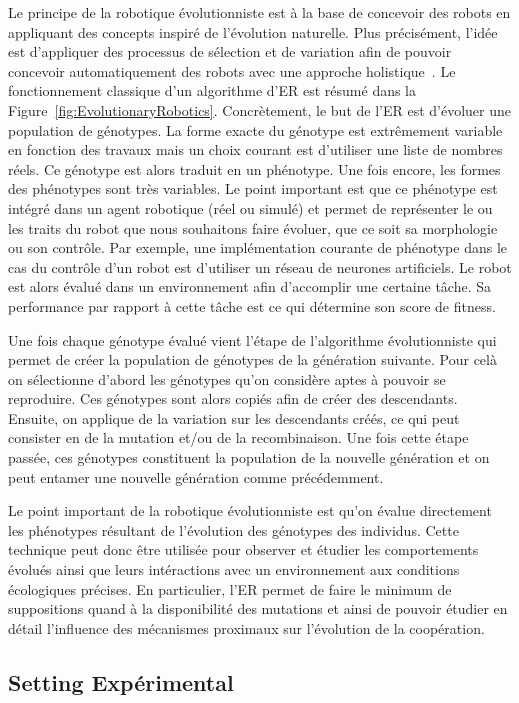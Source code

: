     Le principe de la robotique évolutionniste est à la base de concevoir des robots en appliquant des concepts inspiré de l'évolution naturelle. Plus précisément, l'idée est d'appliquer des processus de sélection et de variation afin de pouvoir concevoir automatiquement des robots avec une approche holistique~\parencite{Nolfi2000, Doncieux2015a}. Le fonctionnement classique d'un algorithme d'ER est résumé dans la Figure~\ref{fig:EvolutionaryRobotics}. Concrètement, le but de l'ER est d'évoluer une population de génotypes. La forme exacte du génotype est extrêmement variable en fonction des travaux mais un choix courant est d'utiliser une liste de nombres réels. Ce génotype est alors traduit en un phénotype. Une fois encore, les formes des phénotypes sont très variables. Le point important est que ce phénotype est intégré dans un agent robotique (réel ou simulé) et permet de représenter le ou les traits du robot que nous souhaitons faire évoluer, que ce soit sa morphologie ou son contrôle. Par exemple, une implémentation courante de phénotype dans le cas du contrôle d'un robot est d'utiliser un réseau de neurones artificiels. Le robot est alors évalué dans un environnement afin d'accomplir une certaine tâche. Sa performance par rapport à cette tâche est ce qui détermine son score de fitness. 

    Une fois chaque génotype évalué vient l'étape de l'algorithme évolutionniste qui permet de créer la population de génotypes de la génération suivante. Pour celà on sélectionne d'abord les génotypes qu'on considère aptes à pouvoir se reproduire. Ces génotypes sont alors copiés afin de créer des descendants. Ensuite, on applique de la variation sur les descendants créés, ce qui peut consister en de la mutation et/ou de la recombinaison. Une fois cette étape passée, ces génotypes constituent la population de la nouvelle génération et on peut entamer une nouvelle génération comme précédemment.

    Le point important de la robotique évolutionniste est qu'on évalue directement les phénotypes résultant de l'évolution des génotypes des individus. Cette technique peut donc être utilisée pour observer et étudier les comportements évolués ainsi que leurs intéractions avec un environnement aux conditions écologiques précises. En particulier, l'ER permet de faire le minimum de suppositions quand à la disponibilité des mutations et ainsi de pouvoir étudier en détail l'influence des mécanismes proximaux sur l'évolution de la coopération.


   \subsection{Setting Expérimental}


